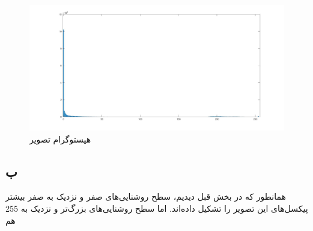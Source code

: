 \documentclass{article}
\begin{document}
\subsubsection{}
\begin{latin}

\end{latin}
\subsubsection{}
\begin{latin}

\end{latin}
\begin{figure}[H]
    \centering
    \includegraphics[width=1\textwidth]{figures/p6a.jpg}
    \caption
	{
هیستوگرام تصویر 
	}
    \label{fig:fig1}
\end{figure}


\subsection{ب}
همانطور که در بخش قبل دیدیم، سطح روشنایی‌های صفر و نزدیک به صفر بیشتر پیکسل‌های این تصویر را تشکیل داده‌اند. اما سطح روشنایی‌های بزرگ‌تر و نزدیک به 255 هم 


%




\end{document}
